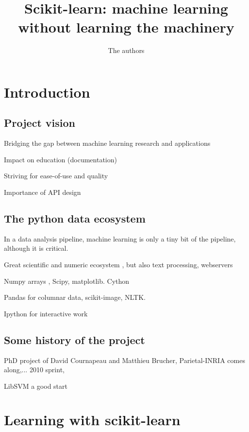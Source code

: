 \documentclass{article}
\begin{document}
\title{Scikit-learn: machine learning without learning the machinery}

\author{The authors}

\maketitle

\section{Introduction}

\subsection{Project vision}

Bridging the gap between machine learning research and applications

\cite{pedregosa2011}

Impact on education (documentation)

Striving for ease-of-use and quality

Importance of API design \cite{buitinck2013ecml}

\subsection{The python data ecosystem}

In a data analysis pipeline, machine learning is only a tiny bit of the
pipeline, although it is critical.

Great scientific and numeric ecosystem
\cite{oliphant2007python,varoquaux2013scipy}, but also text processing,
webservers

Numpy arrays \cite{vanderwalt2011}, Scipy, matplotlib. Cython
\cite{behnel2011cython}

Pandas for columnar data, scikit-image, NLTK.

Ipython for interactive work \cite{perez2007ipython}

\subsection{Some history of the project}

PhD project of David Cournapeau and Matthieu Brucher, Parietal-INRIA
comes along,... 2010 sprint, 

LibSVM a good start
\cite{chang2011libsvm}

\section{Learning with scikit-learn}
\end{document}
